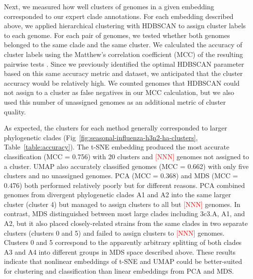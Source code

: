 \documentclass[10pt,letterpaper]{article}
\def\jhc#1{\textcolor{red}{[#1]}}
\begin{document}
Next, we measured how well clusters of genomes in a given embedding corresponded to our expert clade annotations.
For each embedding described above, we applied hierarchical clustering with HDBSCAN to assign cluster labels to each genome.
For each pair of genomes, we tested whether both genomes belonged to the same clade and the same cluster.
We calculated the accuracy of cluster labels using the Matthew's correlation coefficient (MCC) of the resulting pairwise tests \cite{matthews_1975}.
Since we previously identified the optimal HDBSCAN parameter based on this same accuracy metric and dataset, we anticipated that the cluster accuracy would be relatively high.
We counted genomes that HDBSCAN could not assign to a cluster as false negatives in our MCC calculation, but we also used this number of unassigned genomes as an additional metric of cluster quality.

As expected, the clusters for each method generally corresponded to larger phylogenetic clades (Fig~\ref{fig:seasonal-influenza-h3n2-ha-clusters}, Table~\ref{table:accuracy}).
The t-SNE embedding produced the most accurate classification (MCC = 0.756) with 20 clusters and \jhc{NNN} genomes not assigned to a cluster.
UMAP also accurately classified genomes (MCC = 0.662) with only five clusters and no unassigned genomes.
PCA (MCC = 0.368) and MDS (MCC = 0.476) both performed relatively poorly but for different reasons.
PCA combined genomes from divergent phylogenetic clades A1 and A2 into the same larger cluster (cluster 4) but managed to assign clusters to all but \jhc{NNN} genomes.
In contrast, MDS distinguished between most large clades including 3c3.A, A1, and A2, but it also placed closely-related strains from the same clades in two separate clusters (clusters 0 and 5) and failed to assign clusters to \jhc{NNN} genomes.
Clusters 0 and 5 correspond to the apparently arbitrary splitting of both clades A3 and A4 into different groups in MDS space described above.
These results indicate that nonlinear embeddings of t-SNE and UMAP could be better-suited for clustering and classification than linear embeddings from PCA and MDS.
\end{document}
